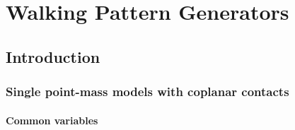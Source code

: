\part{Walking Pattern Generators}\label{part.wpg}
\begin{refsection}


\chapter{Introduction}



\section{Single point-mass models with coplanar contacts}


\subsection{Common variables}


\end{refsection}
